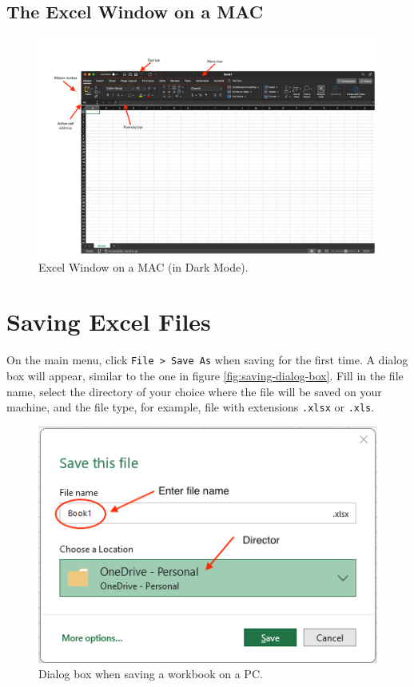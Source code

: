 \documentclass[
]{book}
\begin{document}
\hypertarget{the-excel-window-on-a-mac}{%
\subsection{The Excel Window on a MAC}\label{the-excel-window-on-a-mac}}

\begin{figure}

{\centering \includegraphics[width=1.4\linewidth]{window-mac} 

}

\caption{Excel Window on a MAC (in Dark Mode).}\label{fig:window-mac}
\end{figure}

\hypertarget{saving-excel-files}{%
\section{Saving Excel Files}\label{saving-excel-files}}

On the main menu, click \texttt{File\ \textgreater{}\ Save\ As} when saving for the first time. A dialog box will appear, similar to the one in figure \ref{fig:saving-dialog-box}. Fill in the file name, select the directory of your choice where the file will be saved on your machine, and the file type, for example, file with extensions \texttt{.xlsx} or \texttt{.xls}.

\begin{figure}

{\centering \includegraphics[width=0.45\linewidth]{saving-pc2} 

}

\caption{Dialog box when saving a workbook on a PC.}\label{fig:saving-dialog-box-pc}
\end{figure}
\end{document}
